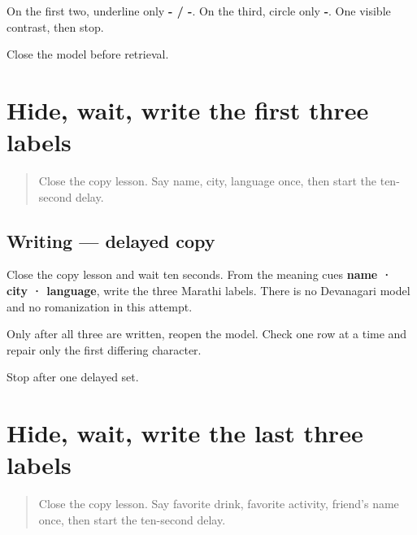 On the first two, underline only \textbf{- / -}. On the third, circle only \textbf{-}. One visible contrast, then stop.

\begin{tcolorbox}[breakable,colback=teal!4,colframe=teal!35!black,title={Before you move on}]
Close the model before retrieval.
\end{tcolorbox}
\section[\texorpdfstring{\mr{नाव} · \mr{शहर} · \mr{भाषा} (nāv · śahar · bhāṣā)}{नाव · शहर · भाषा (nāv · śahar · bhāṣā)}]{Hide, wait, write the first three labels}

\label{lesson:MR-A1F03-first-three-delayed}



\begin{quote}
Close the copy lesson. Say name, city, language once, then start the ten-second delay.
\end{quote}

\subsection*{Writing — delayed copy}
Close the copy lesson and wait ten seconds. From the meaning cues \textbf{name · city · language}, write the three Marathi labels. There is no Devanagari model and no romanization in this attempt.

Only after all three are written, reopen the model. Check one row at a time and repair only the first differing character.

\begin{tcolorbox}[breakable,colback=teal!4,colframe=teal!35!black,title={Before you move on}]
Stop after one delayed set.
\end{tcolorbox}
\section[\texorpdfstring{\mr{आवडते} \mr{पेय} · \mr{आवडती} … (āvaḍte pey …)}{आवडते पेय · आवडती … (āvaḍte pey …)}]{Hide, wait, write the last three labels}

\label{lesson:MR-A1F03-last-three-delayed}



\begin{quote}
Close the copy lesson. Say favorite drink, favorite activity, friend's name once, then start the ten-second delay.
\end{quote}

